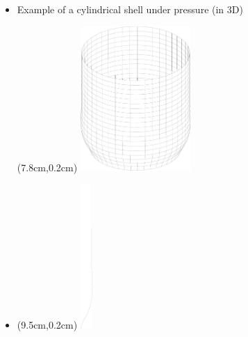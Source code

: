 \begin{frame}{}
  \begin{itemize}
    \item {}
             {Example of a cylindrical shell under pressure (in 3D)}
    \begin{textblock*}{6cm}(7.8cm,0.2cm)
      \includegraphics[height=5.5cm]{images/coque_3d}
    \end{textblock*}
    
  \end{itemize}
  \vspace{1cm}
\end{frame}

\begin{frame}{}
  \begin{itemize}
    \item {}
    \begin{textblock*}{6cm}(9.5cm,0.2cm)
      \includegraphics[height=5.5cm]{images/coque_2d_axi}
    \end{textblock*}
    
  \end{itemize}
  \vspace{1cm}
\end{frame}

